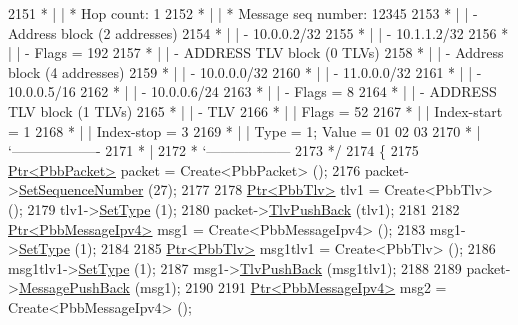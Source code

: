 \begin{DoxyCode}
2151 \textcolor{comment}{         * |    | * Hop count:          1}
2152 \textcolor{comment}{         * |    | * Message seq number: 12345}
2153 \textcolor{comment}{         * |    | - Address block (2 addresses)}
2154 \textcolor{comment}{         * |    |     - 10.0.0.2/32}
2155 \textcolor{comment}{         * |    |     - 10.1.1.2/32}
2156 \textcolor{comment}{         * |    |     - Flags = 192}
2157 \textcolor{comment}{         * |    | - ADDRESS TLV block (0 TLVs)}
2158 \textcolor{comment}{         * |    | - Address block (4 addresses)}
2159 \textcolor{comment}{         * |    |     - 10.0.0.0/32}
2160 \textcolor{comment}{         * |    |     - 11.0.0.0/32}
2161 \textcolor{comment}{         * |    |     - 10.0.0.5/16}
2162 \textcolor{comment}{         * |    |     - 10.0.0.6/24}
2163 \textcolor{comment}{         * |    |     - Flags = 8}
2164 \textcolor{comment}{         * |    | - ADDRESS TLV block (1 TLVs)}
2165 \textcolor{comment}{         * |    |     - TLV}
2166 \textcolor{comment}{         * |    |         Flags = 52}
2167 \textcolor{comment}{         * |    |         Index-start = 1}
2168 \textcolor{comment}{         * |    |         Index-stop = 3}
2169 \textcolor{comment}{         * |    |         Type = 1; Value = 01  02  03}
2170 \textcolor{comment}{         * |    `-------------------}
2171 \textcolor{comment}{         * |}
2172 \textcolor{comment}{         * `------------------}
2173 \textcolor{comment}{   */}
2174   \{
2175     \hyperlink{classns3_1_1Ptr}{Ptr<PbbPacket>} packet = Create<PbbPacket> ();
2176     packet->\hyperlink{classns3_1_1PbbPacket_a7d6a1602be86109760d0f26ff9bbbb8e}{SetSequenceNumber} (27);
2177 
2178     \hyperlink{classns3_1_1Ptr}{Ptr<PbbTlv>} tlv1 = Create<PbbTlv> ();
2179     tlv1->\hyperlink{classns3_1_1PbbTlv_a90a0452018ed364ac37c3ad116dd718b}{SetType} (1);
2180     packet->\hyperlink{classns3_1_1PbbPacket_a34935793e729a106c176db99c969cb42}{TlvPushBack} (tlv1);
2181 
2182     \hyperlink{classns3_1_1Ptr}{Ptr<PbbMessageIpv4>} msg1 = Create<PbbMessageIpv4> ();
2183     msg1->\hyperlink{classns3_1_1PbbMessage_a4b3d1eaabd3e7412a46ac79bf3360dac}{SetType} (1);
2184 
2185     \hyperlink{classns3_1_1Ptr}{Ptr<PbbTlv>} msg1tlv1 = Create<PbbTlv> ();
2186     msg1tlv1->\hyperlink{classns3_1_1PbbTlv_a90a0452018ed364ac37c3ad116dd718b}{SetType} (1);
2187     msg1->\hyperlink{classns3_1_1PbbMessage_aac70b2672f79765cf5cc5b6666018165}{TlvPushBack} (msg1tlv1);
2188 
2189     packet->\hyperlink{classns3_1_1PbbPacket_a4a3170001ef758d9c9c4375b8f089826}{MessagePushBack} (msg1);
2190 
2191     \hyperlink{classns3_1_1Ptr}{Ptr<PbbMessageIpv4>} msg2 = Create<PbbMessageIpv4> ();

\end{DoxyCode}
